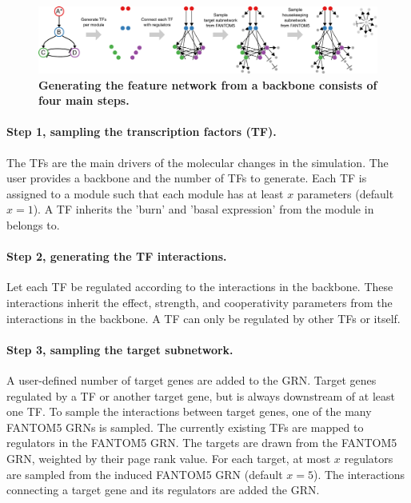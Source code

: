 \begin{figure}[htb!]
	\centering
	\includegraphics[width=\linewidth]{fig/gen_feature_network} 
	\caption{
		\textbf{Generating the feature network from a backbone consists of four main steps.}
	}
	\label{fig:gen_feature_network}
\end{figure}

\paragraph{Step 1, sampling the transcription factors (TF).} The TFs are the main drivers of the molecular changes in the simulation. The user provides a backbone and the number of TFs to generate. Each TF is assigned to a module such that each module has at least $x$ parameters (default $x=1$). A TF inherits the 'burn' and 'basal expression' from the module in belongs to.

\paragraph{Step 2, generating the TF interactions.} Let each TF be regulated according to the interactions in the backbone. These interactions inherit the effect, strength, and cooperativity parameters from the interactions in the backbone. A TF can only be regulated by other TFs or itself.

\paragraph{Step 3, sampling the target subnetwork.} 
A user-defined number of target genes are added to the GRN. Target genes regulated by a TF or another target gene, but is always downstream of at least one TF. To sample the interactions between target genes, one of the many FANTOM5 \cite{lizio_gatewaysfantom5promoter_2015} GRNs is sampled. The currently existing TFs are mapped to regulators in the FANTOM5 GRN. The targets are drawn from the FANTOM5 GRN, weighted by their page rank value. For each target, at most $x$ regulators are sampled from the induced FANTOM5 GRN (default $x=5$). The interactions connecting a target gene and its regulators are added the GRN.


